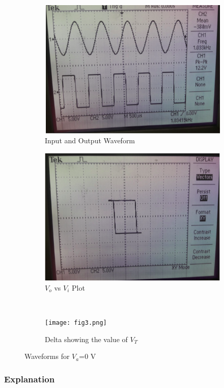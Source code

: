 \documentclass[12pt]{article}
\begin{document}
\begin{figure}[h]
\centering
\begin{subfigure}{.5\textwidth}
  \centering
  \includegraphics[width=.8\linewidth]{fig1.png}
  \caption{Input and Output Waveform}
  \label{fig:sub1}
\end{subfigure}%
\begin{subfigure}{.5\textwidth}
  \centering
  \includegraphics[width=.8\linewidth]{fig2.png}
  \caption{$V_{o}$ vs $V_{i}$ Plot}
  \end{subfigure}%
\\
\begin{subfigure}{.5\textwidth}
  \centering
  \texttt{[image: fig3.png]}
  \caption{Delta showing the value of $V_{T}$}
  \label{fig:sub2}
\end{subfigure}
\caption{Waveforms for $V_{a}$=0 V}
\end{figure}



\subsubsection{Explanation}
\end{document}
